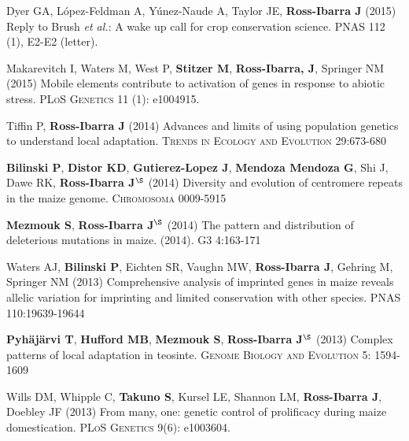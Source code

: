 \begin{etaremune}
\item Dyer GA, L\'opez-Feldman A, Y\'unez-Naude A, Taylor JE, {\bf Ross-Ibarra J} (2015) Reply to Brush \emph{et al.}: A wake up call for crop conservation science. PNAS 112 (1), E2-E2 (letter).


\item Makarevitch I, Waters M, West P, {\bf Stitzer M}, {\bf Ross-Ibarra, J}, Springer NM (2015) Mobile elements contribute to activation of genes in response to abiotic stress. \textsc{PLoS Genetics} 11 (1): e1004915. %


\item Tiffin P, {\bf Ross-Ibarra J} (2014) Advances and limits of using population genetics to understand local adaptation. \textsc{Trends in Ecology and Evolution} 29:673-680 %


\item {\bf Bilinski P}, {\bf Distor KD}, {\bf Gutierez-Lopez J}, {\bf Mendoza Mendoza G}, Shi J, Dawe RK,  {\bf Ross-Ibarra J}$^\S$ (2014) Diversity and evolution of centromere repeats in the maize genome. \textsc{Chromosoma} 0009-5915

\item {\bf Mezmouk S}, {\bf Ross-Ibarra J}$^\S$ (2014) The pattern and distribution of deleterious mutations in maize. (2014). \textsc{G3} 4:163-171

\item Waters AJ, {\bf Bilinski P}, Eichten SR, Vaughn MW, {\bf Ross-Ibarra J}, Gehring M, Springer NM (2013) Comprehensive analysis of imprinted genes in maize reveals allelic variation for imprinting and limited conservation with other species. \textsc{PNAS} 110:19639-19644


\item {\bf Pyh\"aj\"arvi T}, {\bf Hufford MB}, {\bf Mezmouk S}, {\bf Ross-Ibarra J}$^\S$ (2013) Complex patterns of local adaptation in teosinte. \textsc{Genome Biology and Evolution} 5: 1594-1609 %


\item Wills DM, Whipple C, {\bf Takuno S}, Kursel LE, Shannon LM, {\bf Ross-Ibarra J}, Doebley JF (2013) From many, one: genetic control of prolificacy during maize domestication. \textsc{PLoS Genetics} 9(6): e1003604. %



\end{etaremune}
